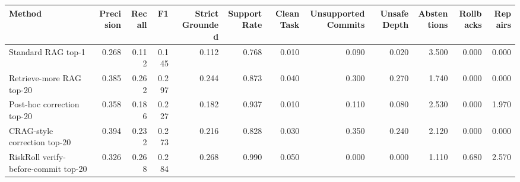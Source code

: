 \begin{tabular}{lrrrrrrrrrrr}
\toprule
Method & Precision & Recall & F1 & Strict Grounded & Support Rate & Clean Task & Unsupported Commits & Unsafe Depth & Abstentions & Rollbacks & Repairs \\
\midrule
Standard RAG top-1 & 0.268 & 0.112 & 0.145 & 0.112 & 0.768 & 0.010 & 0.090 & 0.020 & 3.500 & 0.000 & 0.000 \\
Retrieve-more RAG top-20 & 0.385 & 0.262 & 0.297 & 0.244 & 0.873 & 0.040 & 0.300 & 0.270 & 1.740 & 0.000 & 0.000 \\
Post-hoc correction top-20 & 0.358 & 0.186 & 0.227 & 0.182 & 0.937 & 0.010 & 0.110 & 0.080 & 2.530 & 0.000 & 1.970 \\
CRAG-style correction top-20 & 0.394 & 0.232 & 0.273 & 0.216 & 0.828 & 0.030 & 0.350 & 0.240 & 2.120 & 0.000 & 0.000 \\
RiskRoll verify-before-commit top-20 & 0.326 & 0.268 & 0.284 & 0.268 & 0.990 & 0.050 & 0.000 & 0.000 & 1.110 & 0.680 & 2.570 \\
\bottomrule
\end{tabular}
